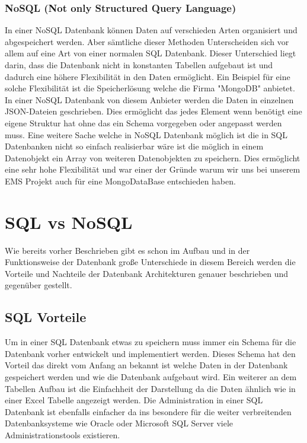 	\subsubsection{NoSQL (Not only Structured Query Language)}	
	In einer NoSQL Datenbank können Daten auf verschieden Arten organisiert und abgespeichert werden. Aber sämtliche dieser Methoden Unterscheiden sich vor allem auf eine Art von einer normalen SQL Datenbank. Dieser Unterschied liegt darin, dass die Datenbank nicht in konstanten Tabellen aufgebaut ist und dadurch eine höhere Flexibilität in den Daten ermöglicht. Ein Beispiel für eine solche Flexibilität ist die Speicherlösung welche die Firma "MongoDB" anbietet. In einer NoSQL Datenbank von diesem Anbieter werden die Daten in einzelnen JSON-Dateien geschrieben. Dies ermöglicht das jedes Element wenn benötigt eine eigene Struktur hat ohne das ein Schema vorgegeben oder angepasst werden muss. Eine weitere Sache welche in NoSQL Datenbank möglich ist die in SQL Datenbanken nicht so einfach realisierbar wäre ist die möglich in einem Datenobjekt ein Array von weiteren Datenobjekten zu speichern. Dies ermöglicht eine sehr hohe Flexibilität und war einer der Gründe warum wir uns bei unserem EMS Projekt auch für eine MongoDataBase entschieden haben.
	
	\section{SQL vs NoSQL}
		Wie bereits vorher Beschrieben gibt es schon im Aufbau und in der Funktionsweise der Datenbank große Unterschiede in diesem Bereich werden die Vorteile und Nachteile der Datenbank Architekturen genauer beschrieben und gegenüber gestellt.
	
	\subsection{SQL Vorteile}
		Um in einer SQL Datenbank etwas zu speichern muss immer ein Schema für die Datenbank vorher entwickelt und implementiert werden. Dieses Schema hat den Vorteil das direkt vom Anfang an bekannt ist welche Daten in der Datenbank gespeichert werden und wie die Datenbank aufgebaut wird. 
		Ein weiterer an dem Tabellen Aufbau ist die Einfachheit der Darstellung da die Daten ähnlich wie in einer Excel Tabelle angezeigt werden. Die Administration in einer SQL Datenbank ist ebenfalls einfacher da ins besondere für die weiter verbreitenden Datenbanksysteme wie Oracle oder Microsoft SQL Server viele Administrationstools existieren.
		
